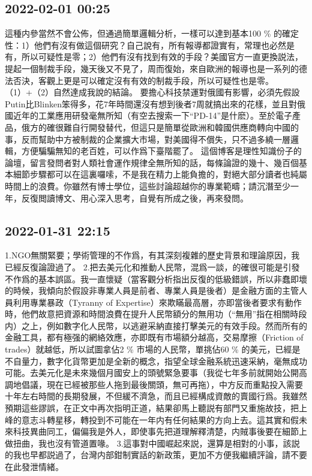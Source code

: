 \documentclass[twocolumn]{ctexart}
\begin{document}
\subsection*{2022-02-01 00:25}

這種内參當然不會公佈，但通過簡單邏輯分析，一樣可以達到基本100 \% 的確定性：1）他們有沒有做這個研究？自己說有，所有報導都證實有，常理也必然是有，所以可疑性是零；2）他們有沒有找到有效的手段？美國官方一直更換説法，提起一個制裁手段，幾天後又不見了，周而復始，來自歐洲的報導也是一系列的德法否決，客觀上更是可以確定沒有有效的制裁手段，所以可疑性也是零。（1）+（2）自然達成我說的結論。
要擔心科技禁運對俄國有影響，必須先假設Putin比Blinken笨得多，花7年時間還沒有想到後者7周就搞出來的花樣，並且對俄國近年的工業應用研發毫無所知（有空去搜索一下“PD-14”是什麽）。至於電子產品，俄方的確很難自行開發替代，但這只是簡單從歐洲和韓國供應商轉向中國的事，反而幫助中方被制裁的企業擴大市場，對美國得不償失，只不過多繞一層邏輯，方便騙騙無知的老百姓，可以作爲下臺階罷了。
這個博客是理性知識份子的論壇，留言發問者對人類社會運作規律全無所知的話，每條論證的幾十、幾百個基本細節步驟都可以在這裏囉嗦，不是我在精力上能負擔的，對絕大部分讀者也純屬時間上的浪費。你雖然有博士學位，這些討論超越你的專業範疇；請沉潛至少一年，反復閲讀博文、用心深入思考，自覺有所成之後，再來發問。
\subsection*{2022-01-31 22:15}

1.NGO無關緊要；學術管理的不作爲，有其深刻複雜的歷史背景和理論原因，我已經反復論證過了。
2.把去美元化和推動人民幣，混爲一談，的確很可能是引發不作爲的基本誤區。我一直懷疑（當客觀分析指出反復的低級錯誤，所以非蠢即壞的時候，我傾向於假設非專業人員是前者、專業人員是後者）是金融方面的主管人員利用專業暴政（Tyranny of Expertise）來欺瞞最高層，亦即當後者要求有動作時，他們故意把資源和時間浪費在提升人民幣額分的無用功（“無用”指在相關時段内）之上，例如數字化人民幣，以逃避采納直接打擊美元的有效手段。然而所有的金融工具，都有極强的網絡效應，亦即既有市場額分越高，交易摩擦（Friction of trades）就越低，所以試圖拿佔2 \% 市場的人民幣，單挑佔60 \% 的美元，已經是不自量力，數字化貨幣更加是全新的概念，指望全球金融系統迅速采納，毫無成功可能。去美元化是未來幾個月國安上的頭號緊急要事（我從七年多前就開始公開高調地倡議，現在已經被那些人拖到最後關頭，無可再拖），中方反而重點投入需要十年左右時間的長期發展，不但緩不濟急，而且已經構成資敵的賣國行爲。我雖然預期這些謬誤，在正文中再次指明正道，結果卻馬上聽説有部門又重施故技，把上峰的意志斗轉星移，轉投到不可能在一年内有任何結果的方向上去。這其實和假未來科技異曲同工，偏偏我是外人，即使事先把道理解釋清楚，内賊事後要在細節上做扭曲，我也沒有管道置喙。
3.這事對中國崛起來説，還算是相對的小事，該説的我也早都説過了，台灣内部鉗制實話的新政策，更加不方便我繼續評論，請不要在此發泄情緒。
\end{document}
